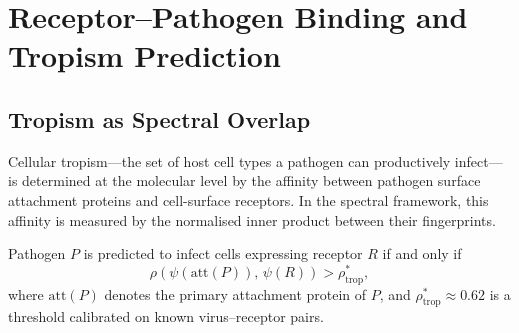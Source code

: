 \section{Receptor--Pathogen Binding and Tropism Prediction}
\label{ps:sec:tropism}

\subsection{Tropism as Spectral Overlap}

Cellular tropism---the set of host cell types a pathogen can productively
infect---is determined at the molecular level by the affinity between pathogen
surface attachment proteins and cell-surface receptors. In the spectral
framework, this affinity is measured by the normalised inner product between
their fingerprints.

\begin{definition}
\label{ps:def:tropism}
Pathogen $P$ is predicted to infect cells expressing receptor $R$ if and only if
\begin{equation}
  \rho\!\left(\psi(\text{att}(P)),\, \psi(R)\right) > \rho^*_{\text{trop}},
  \label{ps:eq:tropism}
\end{equation}
where $\text{att}(P)$ denotes the primary attachment protein of $P$, and
$\rho^*_{\text{trop}} \approx 0.62$ is a threshold calibrated on known
virus--receptor pairs.
\end{definition}

